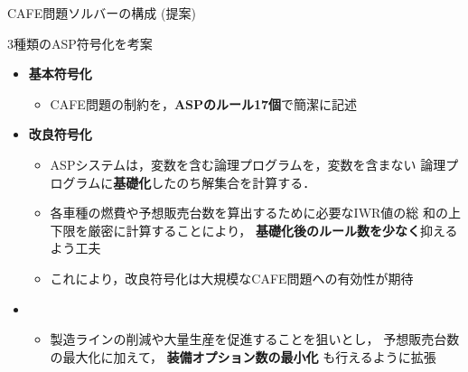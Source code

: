 \documentclass[dvipdfmx, 11pt]{beamer}
\begin{document}
 \begin{frame}{CAFE問題ソルバーの構成 (提案)}
   \scalebox{0.9}{\centering}
   \begin{block}{3種類のASP符号化を考案}
     \begin{itemize}
     \item \alert{\bf 基本符号化}
       \begin{itemize}\footnotesize
       \item CAFE問題の制約を，\textbf{ASPのルール17個}で簡潔に記述
       \end{itemize}
     \item \alert{\bf 改良符号化}
       \begin{itemize}\footnotesize
       \item ASPシステムは，変数を含む論理プログラムを，変数を含まない
         論理プログラムに\textbf{基礎化}したのち解集合を計算する．
       \item 各車種の燃費や予想販売台数を算出するために必要なIWR値の総
         和の上下限を厳密に計算することにより，
         \textbf{基礎化後のルール数を少なく}抑えるよう工夫
       \item これにより，改良符号化は大規模なCAFE問題への有効性が期待
       \end{itemize}
     \item {}
       \begin{itemize}\footnotesize
         \item 製造ラインの削減や大量生産を促進することを狙いとし，
           予想販売台数の最大化に加えて，
           \textbf{装備オプション数の最小化}
           も行えるように拡張
       \end{itemize}
     \end{itemize}
   \end{block}
 \end{frame}
\end{document}
